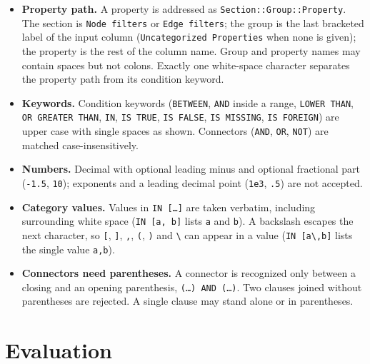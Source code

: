 \documentclass[10pt]{article}
\begin{document}
\begin{itemize}
  \item \textbf{Property path.} A property is addressed as
    \texttt{Section::Group::Property}. The section is \texttt{Node filters} or
    \texttt{Edge filters}; the group is the last bracketed label of the input
    column (\texttt{Uncategorized Properties} when none is given); the property
    is the rest of the column name. Group and property names may contain spaces but not
    colons. Exactly one white-space character separates the property path from
    its condition keyword.
  \item \textbf{Keywords.} Condition keywords (\texttt{BETWEEN},
    \texttt{AND} inside a range, \texttt{LOWER THAN}, \texttt{OR GREATER THAN},
    \texttt{IN}, \texttt{IS TRUE}, \texttt{IS FALSE}, \texttt{IS MISSING},
    \texttt{IS FOREIGN}) are upper case with single spaces as shown.
    Connectors (\texttt{AND}, \texttt{OR}, \texttt{NOT}) are matched
    case-insensitively.
  \item \textbf{Numbers.} Decimal with optional leading minus and optional
    fractional part (\texttt{-1.5}, \texttt{10}); exponents and a leading
    decimal point (\texttt{1e3}, \texttt{.5}) are not accepted.
  \item \textbf{Category values.} Values in \texttt{IN [\ldots]} are taken
    verbatim, including surrounding white space (\texttt{IN [a, b]} lists
    \texttt{a} and \texttt{\textvisiblespace b}). A backslash escapes the next
    character, so \texttt{[}, \texttt{]}, \texttt{,}, \texttt{(}, \texttt{)}
    and \texttt{\textbackslash} can appear in a value
    (\texttt{IN [a\textbackslash,b]} lists the single value \texttt{a,b}).
  \item \textbf{Connectors need parentheses.} A connector is recognized only
    between a closing and an opening parenthesis, \texttt{(\ldots)~AND~(\ldots)}. Two clauses joined without parentheses are rejected. A single
    clause may stand alone or in parentheses.
\end{itemize}

\section*{Evaluation}
\end{document}
